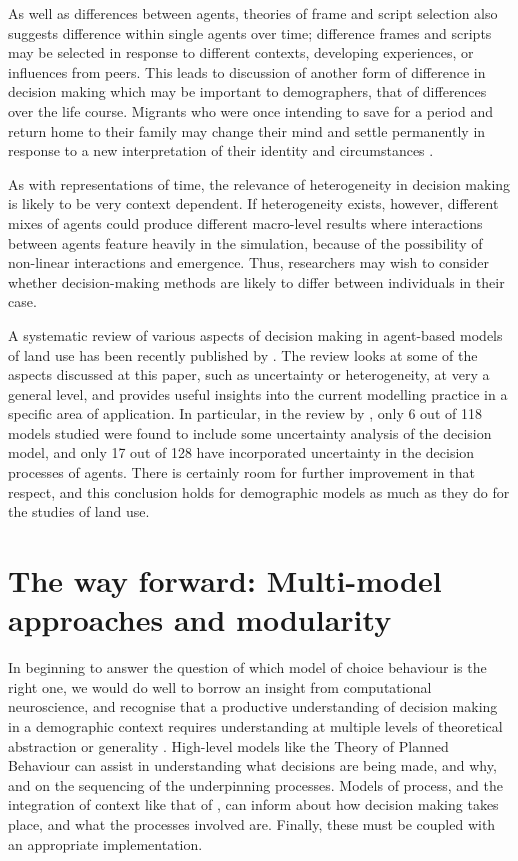 \documentclass{article}
\begin{document}
As well as differences between agents, theories of frame and script selection also suggests difference within single agents over time; difference frames and scripts may be selected in response to different contexts, developing experiences, or influences from peers. This leads to discussion of another form of difference in decision making which may be important to demographers, that of differences over the life course. Migrants who were once intending to save for a period and return home to their family may change their mind and settle permanently in response to a new interpretation of their identity and circumstances \citep{Constant2002}.

As with representations of time, the relevance of heterogeneity in decision making is likely to be very context dependent. If heterogeneity exists, however, different mixes of agents could produce different macro-level results where interactions between agents feature heavily in the simulation, because of the possibility of non-linear interactions and emergence. Thus, researchers may wish to consider whether decision-making methods are likely to differ between individuals in their case.

A systematic review of various aspects of decision making in agent-based models of land use has been recently published by \citet{Groeneveld}. The review looks at some of the aspects discussed at this paper, such as uncertainty or heterogeneity, at very a general level, and provides useful insights into the current modelling practice in a specific area of application. In particular, in the review by \citet{Groeneveld}, only 6 out of 118 models studied were found to include some uncertainty analysis of the decision model, and only 17 out of 128 have incorporated uncertainty in the decision processes of agents. There is certainly room for further improvement in that respect, and this conclusion holds for demographic models as much as they do for the studies of land use.

\section{The way forward: Multi-model approaches and
modularity}\label{multi-model-approaches-and-modularity}

In beginning to answer the question of which model of choice behaviour is the right one, we would do well to borrow an insight from computational neuroscience, and recognise that a productive understanding of decision making in a demographic context requires understanding at multiple levels of theoretical abstraction or generality \citep{Marr1976,Marr1982}. High-level models like the Theory of Planned Behaviour \citep{Ajzen1991} can assist in understanding what decisions are being made, and why, and on the sequencing of the underpinning processes. Models of process, and the integration of context like that of \citet{Ben-Akiva2012}, can inform about how decision making takes place, and what the processes involved are. Finally, these must be coupled with an appropriate implementation. 
\end{document}
